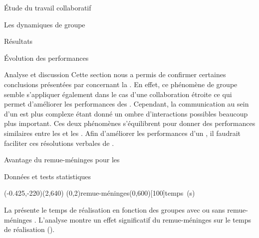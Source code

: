 \documentclass[myfrancais]{mythesis}
\begin{document}
\begin{mypart}{Étude du travail collaboratif}
\begin{mychapter}{Les dynamiques de groupe}
\begin{mysection}{Résultats}
\begin{mysubsection}{Évolution des performances}
\begin{mysubsubsection}{Analyse et discussion}
						Cette section nous a permis de confirmer certaines conclusions présentées par  concernant la .
						En effet, ce phénomène de groupe semble s'appliquer également dans le cas d'une collaboration étroite ce qui permet d'améliorer les performances des .
						Cependant, la communication au sein d'un  est plus complexe étant donné un ombre d'interactions possibles beaucoup plus important.
						Ces deux phénomènes s'équilibrent pour donner des performances similaires entre les  et les .
						Afin d'améliorer les performances d'un , il faudrait faciliter ces résolutions verbales de .
					\end{mysubsubsection}
				\end{mysubsection}
				\begin{mysubsection}{Avantage du remue-méninges pour les }
					\begin{mysubsubsection}{Données et tests statistiques}
						\begin{myfigure}
							\begin{myps}(-0.425,-220)(2,640)
								\myaxes(0,2){remue-méninges}(0,600)[100]{temps~(s)}
							\end{myps}
						\end{myfigure}

						La  présente le temps de réalisation  en fonction des groupes avec ou sans remue-méninges .
						L'analyse montre un effet significatif du remue-méninges  sur le temps de réalisation  ().


\end{mysubsubsection}
\end{mysubsection}
\end{mysection}
\end{mychapter}
\end{mypart}
\end{document}
